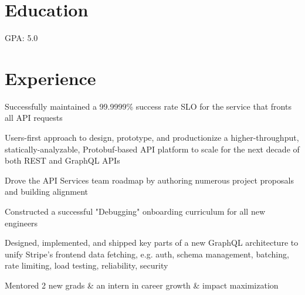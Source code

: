 \sectionsep
\section{Education}
\raggedright

\hfill GPA: 5.0 \hfill {} \\
\sectionsep

\section{Experience}

\hfill {}
\begin{tightemize}
	\item Successfully maintained a 99.9999\% success rate SLO for the service that fronts all API requests
  \item Users-first approach to design, prototype, and productionize a higher-throughput, statically-analyzable, Protobuf-based API platform to scale for the next decade of both REST and GraphQL APIs
  \item Drove the API Services team roadmap by authoring numerous project proposals and building alignment
  \item Constructed a successful "Debugging" onboarding curriculum for all new engineers
\end{tightemize}
\sectionsep

\hfill {}
\begin{tightemize}
  \item Designed, implemented, and shipped key parts of a new GraphQL architecture to unify Stripe's frontend data fetching, e.g. auth, schema management, batching, rate limiting, load testing, reliability, security
  \item Mentored 2 new grads \& an intern in career growth \& impact maximization
\end{tightemize}
\sectionsep

